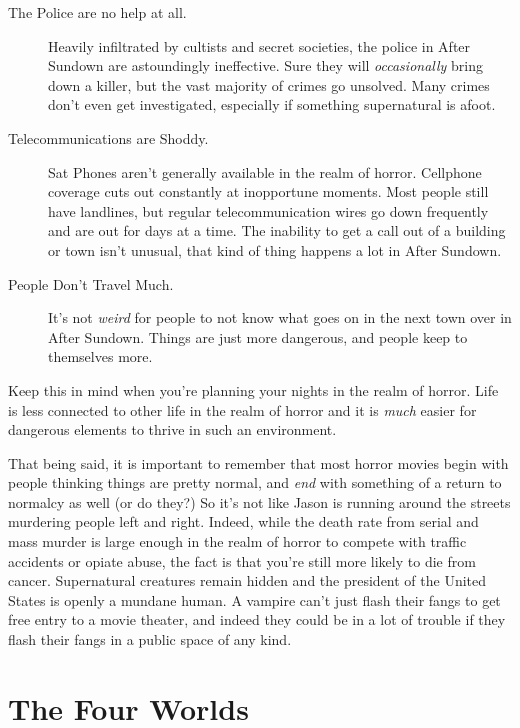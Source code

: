 \begin{description}
\item[The Police are no help at all.] Heavily infiltrated by cultists and secret societies, the police in After Sundown are astoundingly ineffective. Sure they will \textit{occasionally} bring down a killer, but the vast majority of crimes go unsolved. Many crimes don't even get investigated, especially if something supernatural is afoot.
\item[Telecommunications are Shoddy.] Sat Phones aren't generally available in the realm of horror. Cellphone coverage cuts out constantly at inopportune moments. Most people still have landlines, but regular telecommunication wires go down frequently and are out for days at a time. The inability to get a call out of a building or town isn't unusual, that kind of thing happens a lot in After Sundown.
\item[People Don't Travel Much.] It's not \textit{weird} for people to not know what goes on in the next town over in After Sundown. Things are just more dangerous, and people keep to themselves more.
\end{description}

Keep this in mind when you're planning your nights in the realm of horror. Life is less connected to other life in the realm of horror and it is \textit{much} easier for dangerous elements to thrive in such an environment.

That being said, it is important to remember that most horror movies begin with people thinking things are pretty normal, and \textit{end} with something of a return to normalcy as well (or do they?) So it's not like Jason is running around the streets murdering people left and right. Indeed, while the death rate from serial and mass murder is large enough in the realm of horror to compete with traffic accidents or opiate abuse, the fact is that you're still more likely to die from cancer. Supernatural creatures remain hidden and the president of the United States is openly a mundane human. A vampire can't just flash their fangs to get free entry to a movie theater, and indeed they could be in a lot of trouble if they flash their fangs in a public space of any kind.

\section{The Four Worlds}

